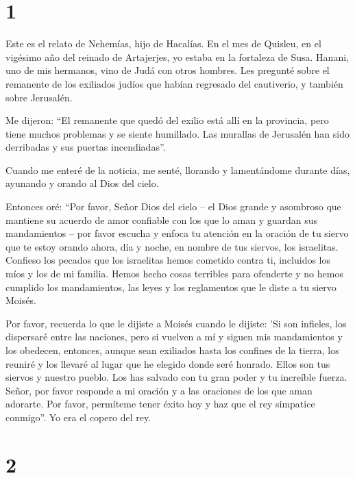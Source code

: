 \hypertarget{section}{%
\section{1}\label{section}}

 Este es el relato de Nehemías, hijo de Hacalías. En el mes
de Quisleu, en el vigésimo año del reinado de Artajerjes, yo estaba en
la fortaleza de Susa.  Hanani, uno de mis hermanos, vino de
Judá con otros hombres. Les pregunté sobre el remanente de los exiliados
judíos que habían regresado del cautiverio, y también sobre Jerusalén.

 Me dijeron: ``El remanente que quedó del exilio está allí
en la provincia, pero tiene muchos problemas y se siente humillado. Las
murallas de Jerusalén han sido derribadas y sus puertas incendiadas''.

 Cuando me enteré de la noticia, me senté, llorando y
lamentándome durante días, ayunando y orando al Dios del cielo.

 Entonces oré: ``Por favor, Señor Dios del cielo -- el Dios
grande y asombroso que mantiene su acuerdo de amor confiable con los que
lo aman y guardan sus mandamientos --  por favor escucha y
enfoca tu atención en la oración de tu siervo que te estoy orando ahora,
día y noche, en nombre de tus siervos, los israelitas. Confieso los
pecados que los israelitas hemos cometido contra ti, incluidos los míos
y los de mi familia.  Hemos hecho cosas terribles para
ofenderte y no hemos cumplido los mandamientos, las leyes y los
reglamentos que le diste a tu siervo Moisés.

 Por favor, recuerda lo que le dijiste a Moisés cuando le
dijiste: 'Si son infieles, los dispersaré entre las naciones,
 pero si vuelven a mí y siguen mis mandamientos y los
obedecen, entonces, aunque sean exiliados hasta los confines de la
tierra, los reuniré y los llevaré al lugar que he elegido donde seré
honrado.  Ellos son tus siervos y nuestro pueblo. Los has
salvado con tu gran poder y tu increíble fuerza.  Señor,
por favor responde a mi oración y a las oraciones de los que aman
adorarte. Por favor, permíteme tener éxito hoy y haz que el rey
simpatice conmigo''. Yo era el copero del rey.

\hypertarget{section-1}{%
\section{2}\label{section-1}}


